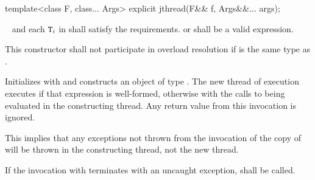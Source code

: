 %
\begin{itemdecl}
template<class F, class... Args> explicit jthread(F&& f, Args&&... args);
\end{itemdecl}
\begin{itemdescr}
  \pnum
\requires\  and each $\texttt{T}_i$ in  shall satisfy the
 requirements.
{\color{diffcolor}
        or
}
 shall be a valid expression.

\pnum\remarks
This constructor shall not participate in overload resolution if 
is the same type as .

\pnum\effects
{\color{diffcolor} Initializes  with  and
}
constructs an object of type .
The new thread of execution executes
{\color{diffcolor}
if that expression is well-formed,
otherwise
}
with the calls to
 being evaluated in the constructing thread.
Any return value from this invocation is ignored.
\begin{note} This implies that any exceptions not thrown from the invocation of the copy
of  will be thrown in the constructing thread, not the new thread. \end{note}
If the invocation
with 
terminates with an uncaught exception,  shall be called.


\end{itemdescr}
